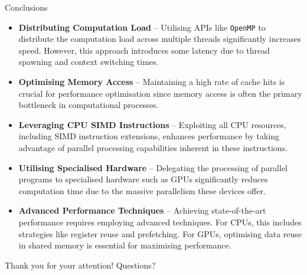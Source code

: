 \documentclass[british, svgnames, dvipsnames]{upb-beamer}
\begin{document}
\begin{frame}{Conclusions}
    \begin{itemize}
        \setlength\itemsep{0.5cm}
        \pause
        \item \textbf{Distributing Computation Load} -- Utilising APIs like \texttt{OpenMP} to distribute the computation load across multiple threads significantly increases speed. However, this approach introduces some latency due to thread spawning and context switching times.
        \pause
        \item \textbf{Optimising Memory Access} -- Maintaining a high rate of cache hits is crucial for performance optimisation since memory access is often the primary bottleneck in computational processes.
        \pause
        \item \textbf{Leveraging CPU SIMD Instructions} -- Exploiting all CPU resources, including SIMD instruction extensions, enhances performance by taking advantage of parallel processing capabilities inherent in these instructions.
        \pause
        \item \textbf{Utilising Specialised Hardware} -- Delegating the processing of parallel programs to specialised hardware such as GPUs significantly reduces computation time due to the massive parallelism these devices offer.
        \pause
        \item \textbf{Advanced Performance Techniques} -- Achieving state-of-the-art performance requires employing advanced techniques. For CPUs, this includes strategies like register reuse and prefetching. For GPUs, optimising data reuse in shared memory is essential for maximising performance.
    \end{itemize}
\end{frame}

\begin{frame}
    \hfill\Huge{Thank you for your attention! Questions?}
    \color{structure.fg!75!black}{\rule{\textwidth}{0.05cm}}
\end{frame}
\end{document}
